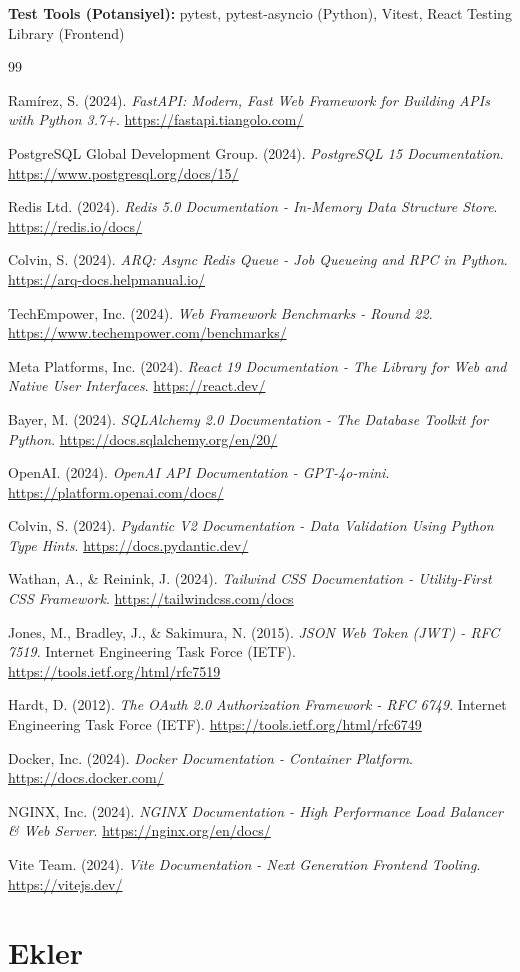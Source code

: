 \documentclass[a4paper,12pt]{report}
\begin{document}
\noindent\textbf{Test Tools (Potansiyel):} pytest, pytest-asyncio (Python), Vitest, React Testing Library (Frontend)
\begin{thebibliography}{99}

Ramírez, S. (2024). \textit{FastAPI: Modern, Fast Web Framework for Building APIs with Python 3.7+}.
\url{https://fastapi.tiangolo.com/}

PostgreSQL Global Development Group. (2024). \textit{PostgreSQL 15 Documentation}.
\url{https://www.postgresql.org/docs/15/}

Redis Ltd. (2024). \textit{Redis 5.0 Documentation - In-Memory Data Structure Store}.
\url{https://redis.io/docs/}

Colvin, S. (2024). \textit{ARQ: Async Redis Queue - Job Queueing and RPC in Python}.
\url{https://arq-docs.helpmanual.io/}

TechEmpower, Inc. (2024). \textit{Web Framework Benchmarks - Round 22}.
\url{https://www.techempower.com/benchmarks/}

Meta Platforms, Inc. (2024). \textit{React 19 Documentation - The Library for Web and Native User Interfaces}.
\url{https://react.dev/}

Bayer, M. (2024). \textit{SQLAlchemy 2.0 Documentation - The Database Toolkit for Python}.
\url{https://docs.sqlalchemy.org/en/20/}

OpenAI. (2024). \textit{OpenAI API Documentation - GPT-4o-mini}.
\url{https://platform.openai.com/docs/}

Colvin, S. (2024). \textit{Pydantic V2 Documentation - Data Validation Using Python Type Hints}.
\url{https://docs.pydantic.dev/}

Wathan, A., \& Reinink, J. (2024). \textit{Tailwind CSS Documentation - Utility-First CSS Framework}.
\url{https://tailwindcss.com/docs}

Jones, M., Bradley, J., \& Sakimura, N. (2015). \textit{JSON Web Token (JWT) - RFC 7519}.
Internet Engineering Task Force (IETF).
\url{https://tools.ietf.org/html/rfc7519}

Hardt, D. (2012). \textit{The OAuth 2.0 Authorization Framework - RFC 6749}.
Internet Engineering Task Force (IETF).
\url{https://tools.ietf.org/html/rfc6749}

Docker, Inc. (2024). \textit{Docker Documentation - Container Platform}.
\url{https://docs.docker.com/}

NGINX, Inc. (2024). \textit{NGINX Documentation - High Performance Load Balancer \& Web Server}.
\url{https://nginx.org/en/docs/}

Vite Team. (2024). \textit{Vite Documentation - Next Generation Frontend Tooling}.
\url{https://vitejs.dev/}

\end{thebibliography}

\appendix

\chapter{Ekler}

\end{document}
